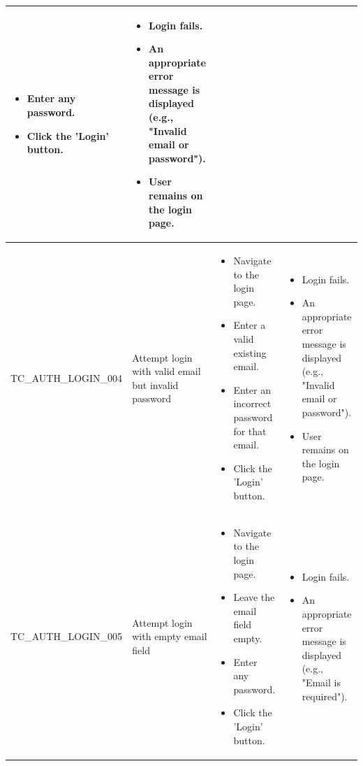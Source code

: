\begin{longtable}{|>{\scriptsize\raggedright\arraybackslash}p{3.5cm}|>{\raggedright\arraybackslash}p{3.5cm}|>{\raggedright\arraybackslash}p{4cm}|>{\raggedright\arraybackslash}p{4cm}|}
\begin{itemize}[noitemsep, topsep=0pt, partopsep=0pt, leftmargin=*]
        \item Enter any password.
        \item Click the 'Login' button.
    \end{itemize} & 
    \begin{itemize}[noitemsep, topsep=0pt, partopsep=0pt, leftmargin=*]
        \item Login fails.
        \item An appropriate error message is displayed (e.g., "Invalid email or password").
        \item User remains on the login page.
    \end{itemize} \\ \hline
TC\_AUTH\_LOGIN\_004 & Attempt login with valid email but invalid password & 
    \begin{itemize}[noitemsep, topsep=0pt, partopsep=0pt, leftmargin=*]
        \item Navigate to the login page.
        \item Enter a valid existing email. 
        \item Enter an incorrect password for that email. 
        \item Click the 'Login' button.
    \end{itemize} & 
    \begin{itemize}[noitemsep, topsep=0pt, partopsep=0pt, leftmargin=*]
        \item Login fails.
        \item An appropriate error message is displayed (e.g., "Invalid email or password").
        \item User remains on the login page.
    \end{itemize} \\ \hline
TC\_AUTH\_LOGIN\_005 & Attempt login with empty email field & 
    \begin{itemize}[noitemsep, topsep=0pt, partopsep=0pt, leftmargin=*]
        \item Navigate to the login page.
        \item Leave the email field empty. 
        \item Enter any password.
        \item Click the 'Login' button.
    \end{itemize} & 
    \begin{itemize}[noitemsep, topsep=0pt, partopsep=0pt, leftmargin=*]
        \item Login fails.
        \item An appropriate error message is displayed (e.g., "Email is required").

\end{itemize}
\end{longtable}
